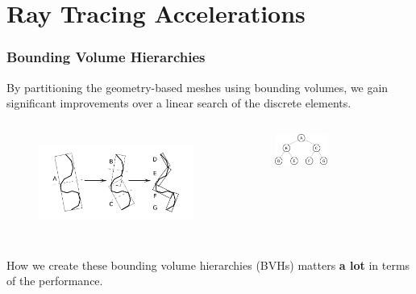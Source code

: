 \documentclass[12pt]{beamer}
\begin{document}
\section{Ray Tracing Accelerations} %


\begin{frame}
\frametitle{Bounding Volume Hierarchies}


By partitioning the geometry-based meshes using bounding volumes, we gain significant improvements over a linear search of the discrete elements.
\begin{columns}
  \begin{figure}
    \centering
    \includegraphics[width=1.1\textwidth]{bvh_2d_ex_w_labels.png} 
    \cite{gottschalk1996obbtree}
  \end{figure}
  
  \begin{figure}
    \centering
    \includegraphics[width=0.5\textwidth]{binary_graph.png}
  \end{figure}
\end{columns}

How we create these bounding volume hierarchies (BVHs) matters \textbf{a lot} in terms of the performance.


\end{frame}
\end{document}
